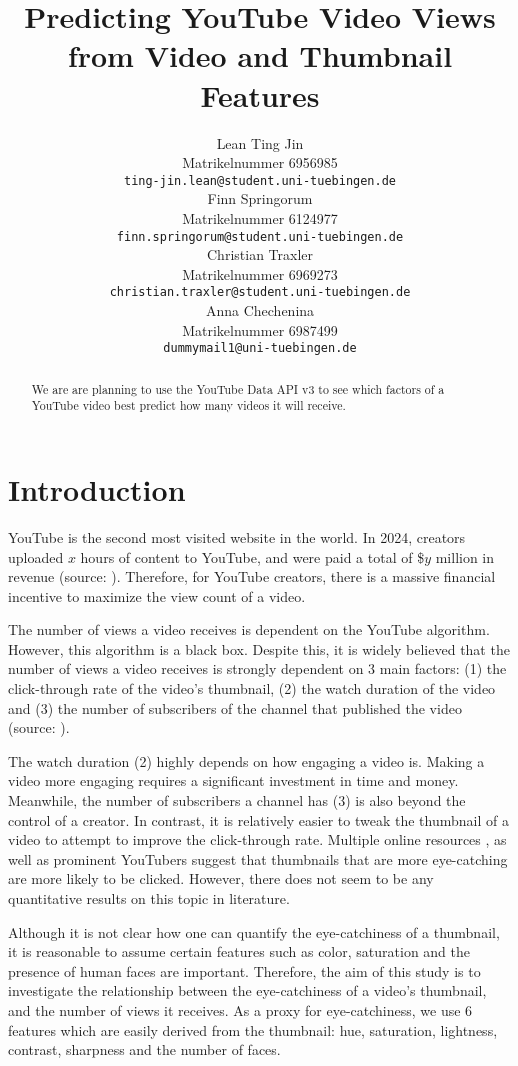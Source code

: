 \documentclass{article}
\title{Predicting YouTube Video Views \\from Video and Thumbnail Features}
\author{%
  Lean Ting Jin\\
  Matrikelnummer 6956985\\
  \texttt{ting-jin.lean@student.uni-tuebingen.de} \\
  \And
  Finn Springorum\\
  Matrikelnummer 6124977\\
  \texttt{finn.springorum@student.uni-tuebingen.de} \\
  \And
  Christian Traxler\\
  Matrikelnummer 6969273\\
  \texttt{christian.traxler@student.uni-tuebingen.de} \\
  \And
  Anna Chechenina\\
  Matrikelnummer 6987499\\
  \texttt{dummymail1@uni-tuebingen.de} \\
}
\begin{document}
\maketitle

\begin{abstract}
  We are are planning to use the YouTube Data API v3 \cite{youtubeapi} to see which factors of a YouTube video best predict how many videos it will receive. 

\end{abstract}

\section{Introduction}
YouTube is the second most visited website in the world. In 2024, creators uploaded $x$ hours of content to YouTube, and were paid a total of \$$y$ million in revenue (source: \cite{}). Therefore, for YouTube creators, there is a massive financial incentive to maximize the view count of a video.

The number of views a video receives is dependent on the YouTube algorithm. However, this algorithm is a black box. Despite this, it is widely believed that the number of views a video receives is strongly dependent on 3 main factors: (1) the click-through rate of the video's thumbnail, (2) the watch duration of the video and (3) the number of subscribers of the channel that published the video (source: \cite{}).

The watch duration (2) highly depends on how engaging a video is. Making a video more engaging requires a significant investment in time and money. Meanwhile, the number of subscribers a channel has (3) is also beyond the control of a creator. In contrast, it is relatively easier to tweak the thumbnail of a video to attempt to improve the click-through rate. Multiple online resources \cite{}, as well as prominent YouTubers \cite{} suggest that thumbnails that are more eye-catching are more likely to be clicked. However, there does not seem to be any quantitative results on this topic in literature.

Although it is not clear how one can quantify the eye-catchiness of a thumbnail, it is reasonable to assume certain features such as color, saturation and the presence of human faces are important.
Therefore, the aim of this study is to investigate the relationship between the eye-catchiness of a video's thumbnail, and the number of views it receives. As a proxy for eye-catchiness, we use 6 features which are easily derived from the thumbnail: hue, saturation, lightness, contrast, sharpness and the number of faces.
\end{document}
